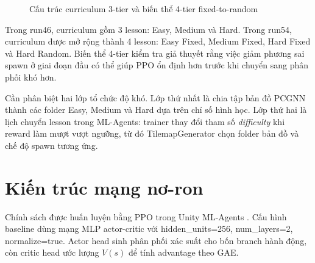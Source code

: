 \begin{figure}[H]
    \centering
    \caption{Cấu trúc curriculum 3-tier và biến thể 4-tier fixed-to-random}
    \label{fig:curriculum_structure}
\end{figure}

Trong run46, curriculum gồm 3 lesson: Easy, Medium và Hard. Trong run54, curriculum được mở rộng thành 4 lesson: Easy Fixed, Medium Fixed, Hard Fixed và Hard Random. Biến thể 4-tier kiểm tra giả thuyết rằng việc giảm phương sai spawn ở giai đoạn đầu có thể giúp PPO ổn định hơn trước khi chuyển sang phân phối khó hơn.

Cần phân biệt hai lớp tổ chức độ khó. Lớp thứ nhất là chia tập bản đồ PCGNN thành các folder Easy, Medium và Hard dựa trên chỉ số hình học. Lớp thứ hai là lịch chuyển lesson trong ML-Agents: trainer thay đổi tham số \emph{difficulty} khi reward làm mượt vượt ngưỡng, từ đó TilemapGenerator chọn folder bản đồ và chế độ spawn tương ứng.

\section{Kiến trúc mạng nơ-ron}

Chính sách được huấn luyện bằng PPO trong Unity ML-Agents \cite{Juliani2018}. Cấu hình baseline dùng mạng MLP actor-critic với hidden\_units=256, num\_layers=2, normalize=true. Actor head sinh phân phối xác suất cho bốn branch hành động, còn critic head ước lượng $V(s)$ để tính advantage theo GAE.


